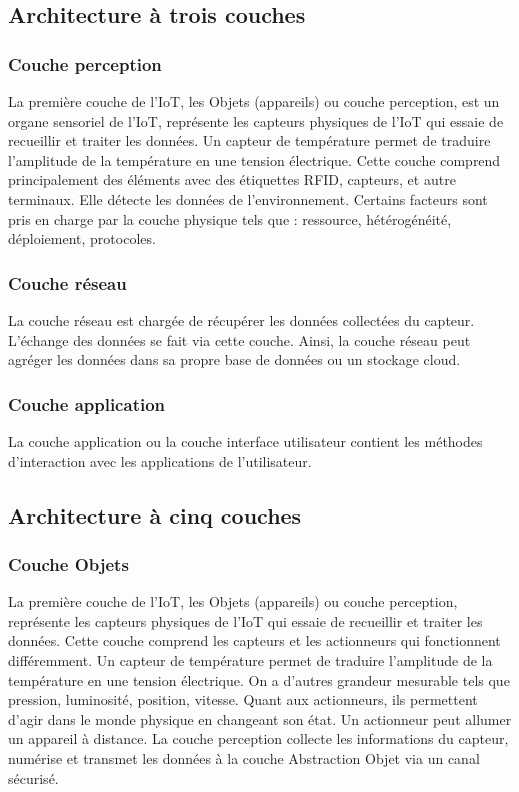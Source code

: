 \subsection{Architecture à trois couches}
\subsubsection{Couche perception }
La première couche de l’IoT, les Objets (appareils) ou couche perception, est un organe sensoriel de l’IoT, représente les capteurs physiques de l’IoT qui essaie de recueillir et traiter les données. Un capteur de température permet de traduire l’amplitude de la température en une tension électrique. Cette couche comprend principalement des éléments avec des étiquettes RFID, capteurs, et autre terminaux. Elle détecte les données de l’environnement. Certains facteurs sont pris en charge par la couche physique tels que : ressource, hétérogénéité, déploiement, protocoles.
\subsubsection{Couche réseau}
La couche réseau est chargée de récupérer les données collectées du capteur. L’échange des données se fait via cette couche. Ainsi, la couche réseau peut agréger les données dans sa propre base de données ou un stockage cloud.
\subsubsection{Couche application}
La couche application ou la couche interface utilisateur contient les méthodes d’interaction avec les applications de l’utilisateur.
\subsection{Architecture à cinq couches}
\subsubsection{Couche Objets}
La première couche de l’IoT, les Objets (appareils) ou couche perception, représente les capteurs physiques de l’IoT qui essaie de recueillir et traiter les données. Cette couche comprend les capteurs et les actionneurs qui fonctionnent dif{\kern0pt}féremment. Un capteur de température permet de traduire l’amplitude de la température en une tension électrique. On a d’autres grandeur mesurable tels que pression, luminosité, position, vitesse. Quant aux actionneurs, ils permettent d’agir dans le monde physique en changeant son état. Un actionneur peut allumer un appareil à distance. La couche perception collecte les informations du capteur, numérise et transmet les données à la couche Abstraction Objet via un canal sécurisé.
